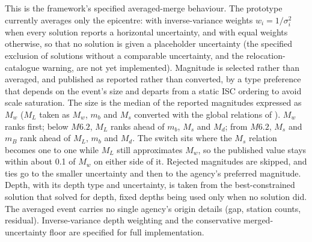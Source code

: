 \documentclass[11pt]{article}
\begin{document}
This is the framework's specified averaged-merge behaviour. The prototype currently averages only the epicentre: with inverse-variance weights $w_i = 1/\sigma_i^{2}$ when every solution reports a horizontal uncertainty, and with equal weights otherwise, so that no solution is given a placeholder uncertainty (the specified exclusion of solutions without a comparable uncertainty, and the relocation-catalogue warning, are not yet implemented). Magnitude is selected rather than averaged, and published as reported rather than converted, by a type preference that depends on the event's size and departs from a static ISC ordering to avoid scale saturation. The size is the median of the reported magnitudes expressed as $M_w$ ($M_L$ taken as $M_w$, $m_b$ and $M_s$ converted with the global relations of \citealp{Scordilis2006}). $M_w$ ranks first; below $M6.2$, $M_L$ ranks ahead of $m_b$, $M_s$ and $M_d$; from $M6.2$, $M_s$ and $m_B$ rank ahead of $M_L$, $m_b$ and $M_d$. The switch sits where the $M_s$ relation becomes one to one while $M_L$ still approximates $M_w$, so the published value stays within about 0.1 of $M_w$ on either side of it. Rejected magnitudes are skipped, and ties go to the smaller uncertainty and then to the agency's preferred magnitude. Depth, with its depth type and uncertainty, is taken from the best-constrained solution that solved for depth, fixed depths being used only when no solution did. The averaged event carries no single agency's origin details (gap, station counts, residual). Inverse-variance depth weighting and the conservative merged-uncertainty floor are specified for full implementation.
\end{document}
